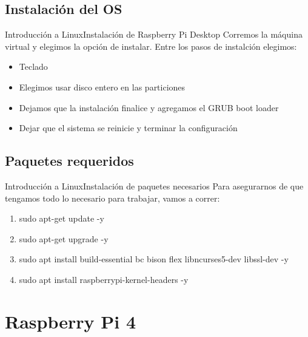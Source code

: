 \documentclass[aspectratio=169, xcolor=dvipsnames]{beamer}
\begin{document}
\subsection{Instalación del OS}
\begin{frame}{Introducción a Linux}{Instalación de Raspberry Pi Desktop}
Corremos la máquina virtual y elegimos la opción de instalar. Entre los pasos de instalción elegimos:
\newline
\begin{itemize}
    \item Teclado
    \item Elegimos usar disco entero en las particiones
    \item Dejamos que la instalación finalice y agregamos el GRUB boot loader
    \item Dejar que el sistema se reinicie y terminar la configuración
\end{itemize}
\end{frame}

\subsection{Paquetes requeridos}
\begin{frame}{Introducción a Linux}{Instalación de paquetes necesarios}
Para asegurarnos de que tengamos todo lo necesario para trabajar, vamos a correr:
\newline
\begin{enumerate}
    \item sudo apt-get update -y
    \item sudo apt-get upgrade -y
    \item sudo apt install build-essential bc bison flex libncurses5-dev libssl-dev -y
    \item sudo apt install raspberrypi-kernel-headers -y
\end{enumerate}
\end{frame}

\section{Raspberry Pi 4}
\end{document}
